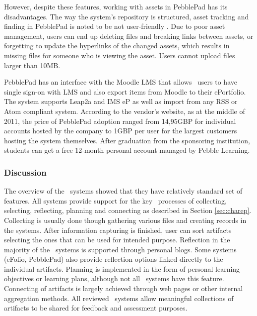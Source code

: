 However, despite these features, working with assets in PebblePad has its
disadvantages. The way the system's repository is structured, asset tracking and
finding in PebblePad is noted to be not user-friendly \citep{Overton2009}. Due
to poor asset management, users can end up deleting files and breaking links
between assets, or forgetting to update the hyperlinks of the changed assets,
which results in missing files for someone who is viewing the asset. Users
cannot upload files larger than 10MB.

PebblePad has an interface with the Moodle LMS that allows \ep~users to have
single sign-on with LMS and also export items from Moodle to their ePortfolio.
The system supports Leap2a and IMS eP as well as import from any RSS or Atom
compliant system. According to the vendor's website, as at the middle of 2011,
the price of PebblePad adoption ranged from 14,95GBP for individual accounts
hosted by the company to 1GBP per user for the largest customers hosting
the system themselves. After graduation from the sponsoring institution,
students can get a free 12-month personal account managed by Pebble Learning.

\subsubsection{Discussion}
The overview of the \ep~systems showed that they have relatively standard set of
features. All systems provide support for the key \ep~processes of collecting,
selecting, reflecting, planning and connecting as described in Section
\ref{sec:charep}. Collecting is usually done though gathering various files and
creating records in the systems. After information capturing is finished, user
can sort artifacts selecting the ones that can be used for intended purpose.
Reflection in the majority of the \ep~systems is supported through personal
blogs. Some systems (eFolio, PebblePad) also provide reflection options linked
directly to the individual artifacts. Planning is implemented in the form of
personal learning objectives or learning plans, although not all \ep~systems
have this feature. Connecting of artifacts is largely achieved through web pages
or other internal aggregation methods. All reviewed \ep~systems allow meaningful
collections of artifacts to be shared for feedback and assessment purposes.

